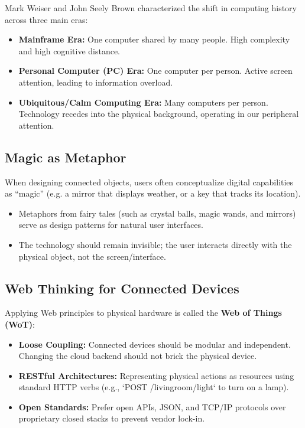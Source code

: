 \documentclass[12pt,a4paper]{article}
\begin{document}
Mark Weiser and John Seely Brown characterized the shift in computing history across three main eras:
\begin{itemize}[leftmargin=*, itemsep=2.5pt]
  \item \textbf{Mainframe Era:} One computer shared by many people. High complexity and high cognitive distance.
  \item \textbf{Personal Computer (PC) Era:} One computer per person. Active screen attention, leading to information overload.
  \item \textbf{Ubiquitous/Calm Computing Era:} Many computers per person. Technology recedes into the physical background, operating in our peripheral attention.
\end{itemize}

\subsection{Magic as Metaphor}
When designing connected objects, users often conceptualize digital capabilities as ``magic'' (e.g. a mirror that displays weather, or a key that tracks its location).
\begin{itemize}[leftmargin=*, itemsep=2pt]
  \item Metaphors from fairy tales (such as crystal balls, magic wands, and mirrors) serve as design patterns for natural user interfaces.
  \item The technology should remain invisible; the user interacts directly with the physical object, not the screen/interface.
\end{itemize}

\subsection{Web Thinking for Connected Devices}
Applying Web principles to physical hardware is called the \textbf{Web of Things (WoT)}:
\begin{itemize}[leftmargin=*, itemsep=3pt]
  \item \textbf{Loose Coupling:} Connected devices should be modular and independent. Changing the cloud backend should not brick the physical device.
  \item \textbf{RESTful Architectures:} Representing physical actions as resources using standard HTTP verbs (e.g., `POST /livingroom/light` to turn on a lamp).
  \item \textbf{Open Standards:} Prefer open APIs, JSON, and TCP/IP protocols over proprietary closed stacks to prevent vendor lock-in.
\end{itemize}
\end{document}
